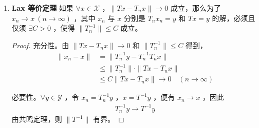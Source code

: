 \begin{enumerate}[leftmargin=2cm, label=\arabic*]
\begin{proof}
			(2) $A$ 是满射，先证明 $R(A)$ 是闭的，事实上，$\forall w\in\overline{R}(A)$ ，$\exists v_n\in\mathscr{X}$ 使得 
			\begin{equation*}
				w = \lim\limits_{n\to\infty} Av_n
			\end{equation*}
			则
			\begin{align*}
				\delta\|v_{n+p} - v_n\| &\leqslant |a(v_{n+p} - v_n, v_{n+p}-v_n| \\
				&= |(v_{n+p} - v_n, A(v_{n+p} - v_n) )|  \\
				& \leqslant \|v_{n+p} - v_n\| \cdot \|Av_{n+p} - Av_n\|
			\end{align*}
			即得
			\begin{align*}
				\|v_{n+p} - v_n\| \leqslant \frac{1}{\delta} \|Av_{n+p} - Av_n\| \to 0
			\end{align*}
			从而 $v_n$ 是基本列，因此 $\exists v^*\in\mathscr{X}$ ，使得 $v_n\to v^*$ ，并且有连续性得 $w = Av^*$ ，即得 $w\in R(A)$ ，于是 $R(A)$ 是闭集。再证明 $R(A)^{\perp} = \{\theta\}$ 。倘若 $w\in R(A)^{\perp}$ ，则
			\begin{align*}
				(w, Av) = 0 \quad (\forall v\in\mathscr{X})
			\end{align*}
			即 $a(w, v) = 0$ ，特别取 $v = w$ ，即得
			\begin{align*}
				\delta\|w\|^2 \leqslant |a(w, w)| = 0
			\end{align*}
			故而 $w =\theta$ ，则 $A$ 为满射。
			
			(3) 再利用 \textbf{Banach 逆算子定理} ，$A^{-1}\in\mathscr{L}(\mathscr{X})$ ，因为
			\begin{equation*}
				\delta\|x\|^2 \leqslant |a(x,x)| = |(x, Ax)| \leqslant \|x\| \cdot \|Ax\|
			\end{equation*}
			所以 $\delta\|x\|\leqslant \|Ax\|$ ，故而 $\|A^{-1}\|\leqslant \frac{1}{\delta}$ 。
			
		\end{proof}
		\item \textbf{Lax 等价定理}  如果 $\forall x\in\mathscr{X}$ ，$\|Tx - T_n x\|\to 0$ 成立，那么为了 $x_n\to x\ (n\to\infty)$ ，其中 $x_n$ 与 $x$ 分别是 $T_nx_n= y$ 和 $Tx = y$ 的解，必须且仅须 $\exists C>0$ ，使得 $\|T^{-1}_n\|\leqslant C$ 成立。
		\begin{proof}
			充分性。由 $\|Tx - T_nx\|\to 0$ 和 $\|T^{-1}_n\|\leqslant C$ 得到，
			\begin{align*}
				\|x_n - x\| &= \|T^{-1}_n y - T^{-1}_n T_n x\| \\
				& \leqslant \|T^{-1}_n\|\cdot \|Tx - T_nx\| \\
				& \leqslant C\|Tx- T_nx\| \to 0 \quad (n\to\infty)
			\end{align*}
			
			必要性。$\forall y\in\mathscr{Y}$ ，令 $x_n = T^{-1}_n y$ ，$x= T^{-1}y$ ，便有 $x_n\to x$ ，因此
			\begin{align*}
				T^{-1}_n y \to T^{-1} y
			\end{align*}
			由共鸣定理，则 $\|T^{-1}\|$ 有界。
		\end{proof}
	\end{enumerate}
	
